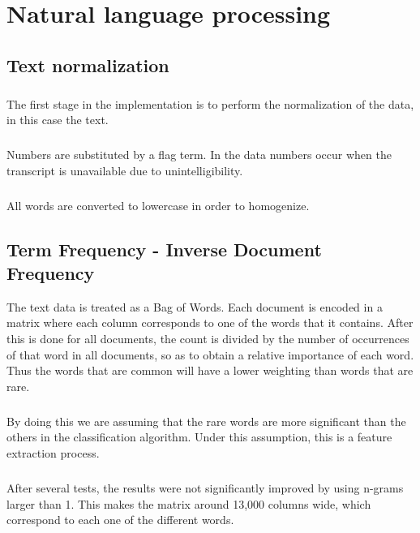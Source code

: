 \documentclass[12pt,a4paper]{report}
\begin{document}
\chapter{Natural language processing}
\section{Text normalization}
\paragraph{} The first stage in the implementation is to perform the normalization of the data, in this case the text.

\paragraph{} Numbers are substituted by a flag term. In the data numbers occur when the transcript is unavailable due to unintelligibility.

\paragraph{} All words are converted to lowercase in order to homogenize.


\section{Term Frequency - Inverse Document Frequency} The text data is treated as a Bag of Words. Each document is encoded in a matrix where each column corresponds to one of the words that it contains. After this is done for all documents, the count is divided by the number of occurrences of that word in all documents, so as to obtain a relative importance of each word. Thus the words that are common will have a lower weighting than words that are rare.

\paragraph{} By doing this we are assuming that the rare words are more significant than the others in the classification algorithm. Under this assumption, this is a feature extraction process.

\paragraph{} After several tests, the results were not significantly improved by using n-grams larger than 1. This makes the matrix around 13,000 columns wide, which correspond to each one of the different words.
\end{document}
